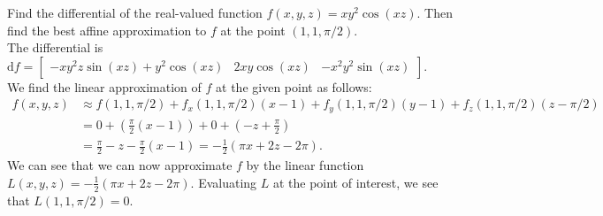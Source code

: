 \documentclass[12pt]{book}
\newenvironment{exercise}[2][Exercise]{\begin{trivlist}
\item[\hskip \labelsep {\bfseries #1}\hskip \labelsep {\bfseries #2.}]}{\end{trivlist}}
\begin{document}
\begin{exercise}{7.2.7}
\begin{exercise}{9.2.5}
	Find the differential of the real-valued function $f(x,y,z) = x y^2 \cos(x z)$. Then find the best affine approximation to $f$ at the point $(1, 1, \pi/2)$. \\

	The differential is $\text{d} f = \left[\begin{matrix}- x y^{2} z \sin{\left (x z \right )} + y^{2} \cos{\left (x z \right )} & 2 x y \cos{\left (x z \right )} & - x^{2} y^{2} \sin{\left (x z \right )}\end{matrix}\right]$. \\
    We find the linear approximation of $f$ at the given point as follows:
    \begin{align*}
    f(x,y,z) &\approx f(1,1,\pi/2) + f_x(1,1,\pi/2) (x-1) + f_y(1,1,\pi/2) (y-1) + f_z(1,1,\pi/2) (z-\pi/2) \\
     &= 0 + \left( \frac{\pi}{2} \left(x - 1\right) \right) + 0 + \left( - z + \frac{\pi}{2} \right) \\
     &= \frac{\pi}{2} - z - \frac{\pi}{2} \left(x - 1\right) = - \frac{1}{2} \left(\pi x + 2 z - 2 \pi\right).
    \end{align*}
    We can see that we can now approximate $f$ by the linear function $L(x,y,z) =- \frac{1}{2} \left(\pi x + 2 z - 2 \pi\right)$. Evaluating $L$ at the point of interest, we see that $L(1,1,\pi/2)=0$.
\end{exercise}



\end{exercise}
\end{document}
